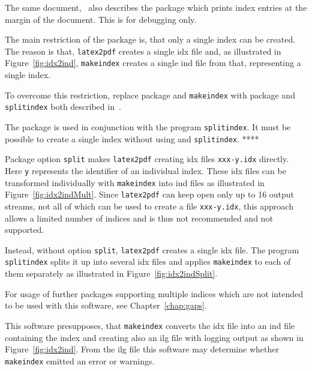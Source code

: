 The same document,~\cite{MkidxShIdxP} 
also describes the package  
which prints index entries at the margin of the document. 
This is for debugging only. 
\medskip


The main restriction of the package  is, 
that only a single index can be created. 
The reason is that, \texttt{latex2pdf} creates a single \gls{idx} file 
and, as illustrated in Figure~\ref{fig:idx2ind}, 
\texttt{makeindex} creates a single ind file from that, 
representing a single index. 

To overcome this restriction, 
replace package  and \texttt{makeindex} 
with package  and \texttt{splitindex} 
both described in~\cite{SplitidxP}. 

The package  is used 
in conjunction with the program \texttt{splitindex}. 
It must be possible to create a single index 
without using  and \texttt{splitindex}. **** 

Package option \texttt{split} makes \texttt{latex2pdf} 
creating \gls{idx} files \texttt{xxx-y.idx} directly. 
Here \texttt{y} represents the identifier of an individual index. 
These \gls{idx} files can be transformed individually with \texttt{makeindex} 
into ind files as illustrated in Figure~\ref{fig:idx2indMult}. 
Since \texttt{latex2pdf} can keep open only up to 16 output streams, 
not all of which can be used to create a file \texttt{xxx-y.idx}, 
this approach allows a limited number of indices 
and is thus not recommended and not supported. 

Instead, without option \texttt{split}, 
\texttt{latex2pdf} creates a single \gls{idx} file. 
The program \texttt{splitindex} splits it up into several \gls{idx} files 
and applies \texttt{makeindex} to each of them separately 
as illustrated in Figure~\ref{fig:idx2indSplit}. 

For usage of further packages supporting multiple indices 
which are not intended to be used with this software, 
see Chapter~\ref{chap:gaps}. 

This software presupposes, that \texttt{makeindex} converts the \gls{idx} file 
into an ind file containing the index 
and creating also an ilg file with logging output 
as shown in Figure~\ref{fig:idx2ind}. 
From the ilg file this software may determine 
whether \texttt{makeindex} emitted an error or warnings. 

